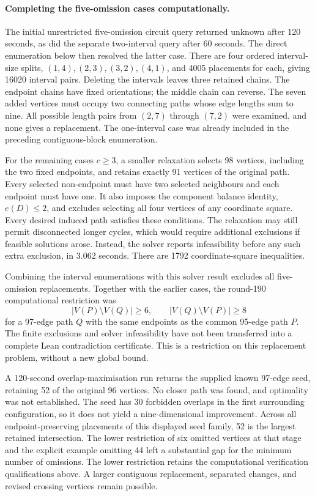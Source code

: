 \documentclass[11pt,a4paper]{article}
\theoremstyle{definition}
\theoremstyle{remark}
\begin{document}
\paragraph{Completing the five-omission cases computationally.}
The initial unrestricted five-omission circuit query returned unknown
after 120 seconds, as did the separate two-interval query after 60 seconds.
The direct enumeration below then resolved the latter case.
There are four ordered interval-size splits, $(1,4),(2,3),(3,2),(4,1)$,
and 4005 placements for each, giving 16020 interval pairs.
Deleting the intervals leaves three retained chains. The endpoint
chains have fixed orientations; the middle chain can reverse.
The seven added vertices must occupy two connecting paths whose edge
lengths sum to nine. All possible length pairs from $(2,7)$ through
$(7,2)$ were examined, and none gives a replacement. The one-interval
case was already included in the preceding contiguous-block enumeration.

For the remaining cases $c\ge3$, a smaller relaxation selects 98 vertices,
including the two fixed endpoints, and retains exactly 91 vertices of
the original path. Every selected non-endpoint must have two selected
neighbours and each endpoint must have one. It also imposes the component
balance identity, $e(D)\le2$, and excludes selecting all four vertices
of any coordinate square. Every desired induced path satisfies these
conditions. The relaxation may still permit disconnected longer cycles,
which would require additional exclusions if feasible solutions arose.
Instead, the solver reports infeasibility before any such extra exclusion,
in 3.062 seconds. There are 1792 coordinate-square inequalities.

Combining the interval enumerations with this solver result excludes all
five-omission replacements. Together with the earlier cases, the round-190
computational restriction was
\[
\boxed{|V(P)\setminus V(Q)|\ge6,\qquad
|V(Q)\setminus V(P)|\ge8}
\]
for a 97-edge path $Q$ with the same endpoints as the common 95-edge path
$P$. The finite exclusions and solver infeasibility have not been
transferred into a complete Lean contradiction certificate. This is a
restriction on this replacement problem, without a new global bound.

A 120-second overlap-maximisation run returns the supplied known
97-edge seed, retaining 52 of the original 96 vertices. No closer path
was found, and optimality was not established. The seed has 30 forbidden
overlaps in the first surrounding configuration, so it does not yield
a nine-dimensional improvement. Across all endpoint-preserving placements
of this displayed seed family, 52 is the largest retained intersection.
The lower restriction of six omitted vertices at that stage and the
explicit example omitting 44 left a substantial gap for the minimum
number of omissions. The lower restriction retains the computational
verification qualifications above. A larger contiguous replacement,
separated changes, and revised crossing vertices remain possible.
\end{document}
